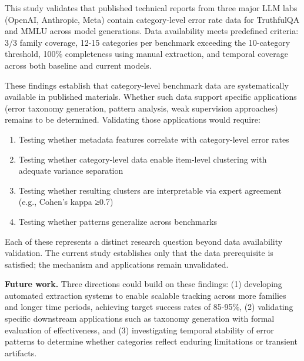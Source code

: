
This study validates that published technical reports from three major LLM labs (OpenAI, Anthropic, Meta) contain category-level error rate data for TruthfulQA and MMLU across model generations. Data availability meets predefined criteria: 3/3 family coverage, 12-15 categories per benchmark exceeding the 10-category threshold, 100\% completeness using manual extraction, and temporal coverage across both baseline and current models.

These findings establish that category-level benchmark data are systematically available in published materials. Whether such data support specific applications (error taxonomy generation, pattern analysis, weak supervision approaches) remains to be determined. Validating those applications would require:

\begin{enumerate}
\item Testing whether metadata features correlate with category-level error rates
\item Testing whether category-level data enable item-level clustering with adequate variance separation
\item Testing whether resulting clusters are interpretable via expert agreement (e.g., Cohen's kappa ≥0.7)
\item Testing whether patterns generalize across benchmarks
\end{enumerate}

Each of these represents a distinct research question beyond data availability validation. The current study establishes only that the data prerequisite is satisfied; the mechanism and applications remain unvalidated.

\textbf{Future work.} Three directions could build on these findings: (1) developing automated extraction systems to enable scalable tracking across more families and longer time periods, achieving target success rates of 85-95\%, (2) validating specific downstream applications such as taxonomy generation with formal evaluation of effectiveness, and (3) investigating temporal stability of error patterns to determine whether categories reflect enduring limitations or transient artifacts.
